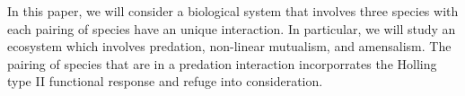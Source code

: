 













In this paper, we will consider a biological system that involves three species with each pairing of species have an unique interaction. In particular, we will study an ecosystem which involves predation, non-linear mutualism, and amensalism. The pairing of species that are in a predation interaction incorporrates the Holling type II functional response and refuge into consideration.  
